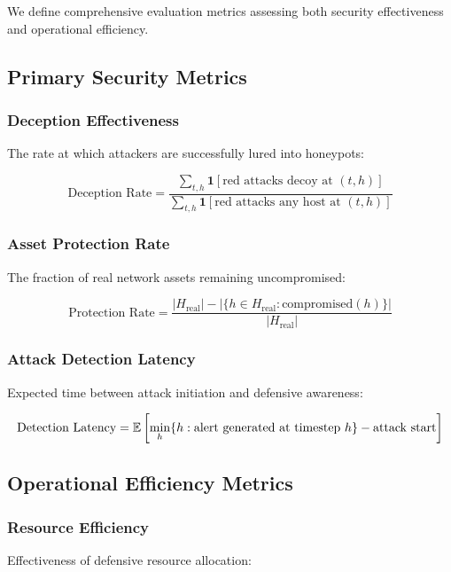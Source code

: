\documentclass[12pt,oneside]{article}
\begin{document}
We define comprehensive evaluation metrics assessing both security effectiveness and operational efficiency.

\subsection{Primary Security Metrics}

\subsubsection{Deception Effectiveness}
The rate at which attackers are successfully lured into honeypots:

\begin{equation}
\text{Deception Rate} = \frac{\sum_{t,h} \mathbf{1}[\text{red attacks decoy at } (t,h)]}{\sum_{t,h} \mathbf{1}[\text{red attacks any host at } (t,h)]}
\end{equation}

\subsubsection{Asset Protection Rate}
The fraction of real network assets remaining uncompromised:

\begin{equation}
\text{Protection Rate} = \frac{|H_{\text{real}}| - |\{h \in H_{\text{real}} : \text{compromised}(h)\}|}{|H_{\text{real}}|}
\end{equation}

\subsubsection{Attack Detection Latency}
Expected time between attack initiation and defensive awareness:

\begin{equation}
\text{Detection Latency} = \mathbb{E}\left[\min_h \{h : \text{alert generated at timestep } h\} - \text{attack start}\right]
\end{equation}

\subsection{Operational Efficiency Metrics}

\subsubsection{Resource Efficiency}
Effectiveness of defensive resource allocation:
\end{document}
